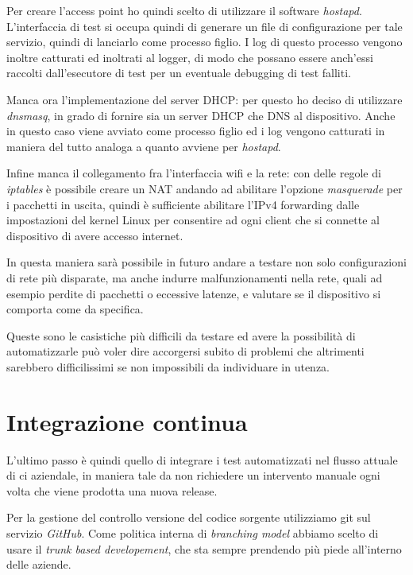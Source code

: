 \documentclass[12pt,a4paper,twoside,titlepage]{book}
\begin{document}
Per creare l'access point ho quindi scelto di utilizzare il software \textit{hostapd}.
L'interfaccia di test si occupa quindi di generare un file di configurazione per tale
servizio, quindi di lanciarlo come processo figlio. I log di questo processo vengono
inoltre catturati ed inoltrati al logger, di modo che possano essere anch'essi raccolti
dall'esecutore di test per un eventuale debugging di test falliti.

Manca ora l'implementazione del server DHCP: per questo ho deciso di utilizzare
\textit{dnsmasq}, in grado di fornire sia un server DHCP che DNS al dispositivo.
Anche in questo caso viene avviato come processo figlio ed i log vengono catturati
in maniera del tutto analoga a quanto avviene per \textit{hostapd}.

Infine manca il collegamento fra l'interfaccia \Gls{wifi} e la rete: con delle 
regole di \textit{iptables} è possibile creare un NAT andando ad abilitare l'opzione
\textit{masquerade} per i pacchetti in uscita, quindi è sufficiente abilitare l'IPv4
forwarding dalle impostazioni del kernel Linux per consentire ad ogni client che si
connette al dispositivo di avere accesso internet.

In questa maniera sarà possibile in futuro andare a testare non solo configurazioni
di rete più disparate, ma anche indurre malfunzionamenti nella rete, quali  ad esempio
perdite di pacchetti o eccessive latenze, e valutare se il dispositivo si comporta come
da specifica.

Queste sono le casistiche più difficili da testare ed avere la possibilità di automatizzarle
può voler dire accorgersi subito di problemi che altrimenti sarebbero difficilissimi
se non impossibili da individuare in utenza.

\section{Integrazione continua}

L'ultimo passo è quindi quello di integrare i test automatizzati nel flusso attuale 
di \acrfull{ci} aziendale, in maniera tale da non richiedere 
un intervento manuale ogni volta che viene prodotta una nuova release. 

Per la gestione del controllo versione del codice sorgente utilizziamo \Gls{git}
 sul servizio \textit{GitHub}. Come politica interna di 
\textit{branching model} abbiamo scelto di usare il \textit{trunk based developement}, 
che sta sempre prendendo più piede all'interno delle aziende. 
\end{document}
